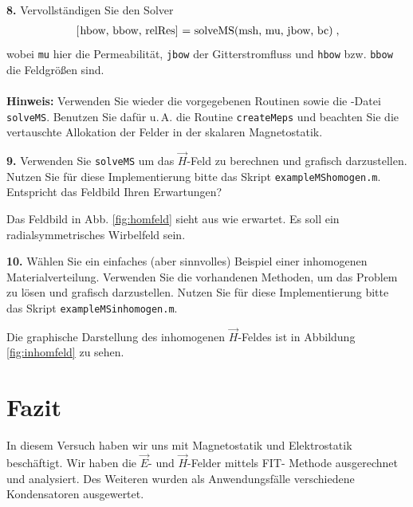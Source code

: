 \documentclass[Protokollheft.tex]{subfiles}
\begin{document}
\begin{framed}
	\noindent \textbf{8.} Vervollständigen Sie den Solver
\begin{align}
\lstinline{[hbow, bbow, relRes] = solveMS(msh, mu, jbow, bc)} \; ,
\end{align}
wobei \lstinline{mu} hier die Permeabilität, \lstinline{jbow} der Gitterstromfluss und
\lstinline{hbow} bzw. \lstinline{bbow} die Feldgrößen sind.\\
\ \\
{\textbf{Hinweis:}} Verwenden Sie wieder die vorgegebenen Routinen sowie die \matlab-Datei \lstinline{solveMS}. Benutzen Sie
dafür u.\,A. die Routine \lstinline{createMeps} und beachten Sie die vertauschte Allokation der Felder in der skalaren Magnetostatik.\label{exer:solveMS}
\end{framed}



\begin{framed}
	\noindent \textbf{9.} Verwenden Sie \lstinline{solveMS} um das $\vec{H}$-Feld zu berechnen und grafisch darzustellen. Nutzen Sie für diese Implementierung bitte das Skript \lstinline{exampleMShomogen.m}. Entspricht das Feldbild Ihren Erwartungen?\label{exer:visualizeHfield}
\end{framed}
\noindent
Das Feldbild in Abb. \ref{fig:homfeld} sieht aus wie erwartet. Es soll ein radialsymmetrisches Wirbelfeld sein.

\begin{framed}
	\noindent \textbf{10.} Wählen Sie ein einfaches (aber sinnvolles) Beispiel einer inhomogenen Materialverteilung. Verwenden Sie die vorhandenen Methoden, um das
Problem zu lösen und grafisch darzustellen. Nutzen Sie für diese Implementierung bitte das Skript \lstinline{exampleMSinhomogen.m}.\label{exer:Hfield4inhomogenMaterial}
\end{framed}
\noindent
Die graphische Darstellung des inhomogenen $\vec{H}$-Feldes ist in Abbildung \ref{fig:inhomfeld} zu sehen.



\section{Fazit}
In diesem Versuch haben wir uns mit Magnetostatik und Elektrostatik beschäftigt. Wir haben die $\vec{E}$- und $\vec{H}$-Felder mittels FIT- Methode ausgerechnet und analysiert. Des Weiteren wurden als Anwendungsfälle verschiedene Kondensatoren ausgewertet.
\end{document}
